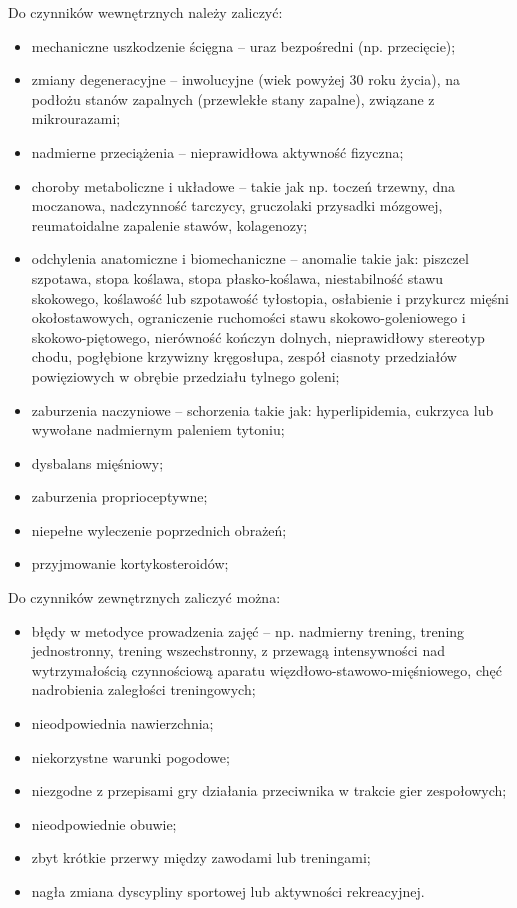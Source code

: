 Do czynników wewnętrznych należy zaliczyć:
\begin{itemize}
	\item mechaniczne uszkodzenie ścięgna -- uraz bezpośredni (np. przecięcie);
	\item zmiany degeneracyjne -- inwolucyjne (wiek powyżej 30 roku życia), na podłożu stanów zapalnych (przewlekłe stany zapalne), związane z mikrourazami;
	\item nadmierne przeciążenia -- nieprawidłowa aktywność fizyczna;
	\item choroby metaboliczne i układowe -- takie jak np. toczeń trzewny, dna moczanowa, nadczynność tarczycy, gruczolaki przysadki mózgowej, reumatoidalne zapalenie stawów, kolagenozy;
	\item odchylenia anatomiczne i biomechaniczne -- anomalie takie jak: piszczel szpotawa, stopa koślawa, stopa płasko-koślawa, niestabilność stawu skokowego, koślawość lub szpotawość tyłostopia, osłabienie i przykurcz mięśni okołostawowych, ograniczenie ruchomości stawu skokowo-goleniowego i skokowo-piętowego, nierówność kończyn dolnych, nieprawidłowy stereotyp chodu, pogłębione krzywizny kręgosłupa, zespół ciasnoty przedziałów powięziowych w obrębie przedziału tylnego goleni;
	\item zaburzenia naczyniowe -- schorzenia takie jak: hyperlipidemia, cukrzyca lub wywołane nadmiernym paleniem tytoniu;
	\item dysbalans mięśniowy;
	\item zaburzenia proprioceptywne;
	\item niepełne wyleczenie poprzednich obrażeń;
	\item przyjmowanie kortykosteroidów;
\end{itemize}

Do czynników zewnętrznych zaliczyć można:
\begin{itemize}
	\item błędy w metodyce prowadzenia zajęć -- np. nadmierny trening, trening jednostronny, trening wszechstronny, z przewagą intensywności nad wytrzymałością czynnościową aparatu więzdłowo-stawowo-mięśniowego, chęć nadrobienia zaległości treningowych;
	\item nieodpowiednia nawierzchnia;
	\item niekorzystne warunki pogodowe;
	\item niezgodne z przepisami gry działania przeciwnika w trakcie gier zespołowych;
	\item nieodpowiednie obuwie;
	\item zbyt krótkie przerwy między zawodami lub treningami;
	\item nagła zmiana dyscypliny sportowej lub aktywności rekreacyjnej.
\end{itemize}

